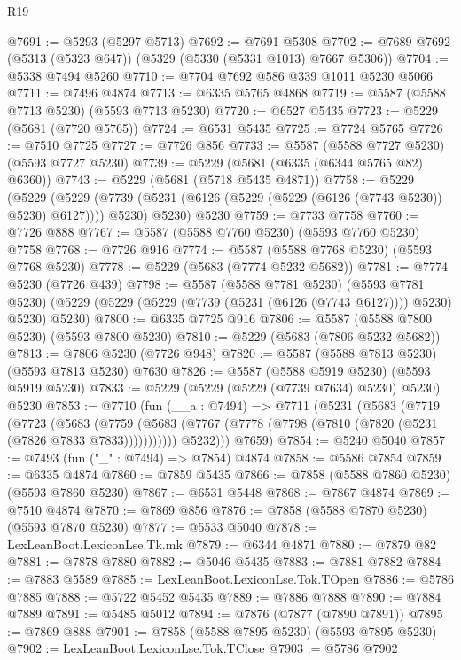 \begin{lexlean}{R19}
\begin{coremodule}
@7691 := @5293 (@5297 @5713)
@7692 := @7691 @5308
@7702 := @7689 @7692 (@5313 (@5323 @647)) (@5329 (@5330 (@5331 @1013) @7667 @5306))
@7704 := @5338 @7494 @5260
@7710 := @7704 @7692 @586 @339 @1011 @5230 @5066
@7711 := @7496 @4874
@7713 := @6335 @5765 @4868
@7719 := @5587 (@5588 @7713 @5230) (@5593 @7713 @5230)
@7720 := @6527 @5435
@7723 := @5229 (@5681 (@7720 @5765))
@7724 := @6531 @5435
@7725 := @7724 @5765
@7726 := @7510 @7725
@7727 := @7726 @856
@7733 := @5587 (@5588 @7727 @5230) (@5593 @7727 @5230)
@7739 := @5229 (@5681 (@6335 (@6344 @5765 @82) @6360))
@7743 := @5229 (@5681 (@5718 @5435 @4871))
@7758 := @5229
    (@5229
      (@5229 (@7739 (@5231 (@6126 (@5229 (@5229 (@6126 (@7743 @5230)) @5230) @6127)))) @5230)
      @5230)
    @5230
@7759 := @7733 @7758
@7760 := @7726 @888
@7767 := @5587 (@5588 @7760 @5230) (@5593 @7760 @5230) @7758
@7768 := @7726 @916
@7774 := @5587 (@5588 @7768 @5230) (@5593 @7768 @5230)
@7778 := @5229 (@5683 (@7774 @5232 @5682))
@7781 := @7774 @5230 (@7726 @439)
@7798 := @5587
    (@5588 @7781 @5230)
    (@5593 @7781 @5230)
    (@5229 (@5229 (@5229 (@7739 (@5231 (@6126 (@7743 @6127)))) @5230) @5230) @5230)
@7800 := @6335 @7725 @916
@7806 := @5587 (@5588 @7800 @5230) (@5593 @7800 @5230)
@7810 := @5229 (@5683 (@7806 @5232 @5682))
@7813 := @7806 @5230 (@7726 @948)
@7820 := @5587 (@5588 @7813 @5230) (@5593 @7813 @5230) @7630
@7826 := @5587 (@5588 @5919 @5230) (@5593 @5919 @5230)
@7833 := @5229 (@5229 (@5229 (@7739 @7634) @5230) @5230) @5230
@7853 := @7710
    (fun (__a : @7494) =>
    @7711
      (@5231
        (@5683
          (@7719
            (@7723
              (@5683
                (@7759
                  (@5683 (@7767 (@7778 (@7798 (@7810 (@7820 (@5231 (@7826 @7833 @7833)))))))))))
            @5232)))
      @7659)
@7854 := @5240 @5040
@7857 := @7493 (fun ("_" : @7494) => @7854) @4874
@7858 := @5586 @7854
@7859 := @6335 @4874
@7860 := @7859 @5435
@7866 := @7858 (@5588 @7860 @5230) (@5593 @7860 @5230)
@7867 := @6531 @5448
@7868 := @7867 @4874
@7869 := @7510 @4874
@7870 := @7869 @856
@7876 := @7858 (@5588 @7870 @5230) (@5593 @7870 @5230)
@7877 := @5533 @5040
@7878 := LexLeanBoot.LexiconLse.Tk.mk
@7879 := @6344 @4871
@7880 := @7879 @82
@7881 := @7878 @7880
@7882 := @5046 @5435
@7883 := @7881 @7882
@7884 := @7883 @5589
@7885 := LexLeanBoot.LexiconLse.Tok.TOpen
@7886 := @5786 @7885
@7888 := @5722 @5452 @5435
@7889 := @7886 @7888
@7890 := @7884 @7889
@7891 := @5485 @5012
@7894 := @7876 (@7877 (@7890 @7891))
@7895 := @7869 @888
@7901 := @7858 (@5588 @7895 @5230) (@5593 @7895 @5230)
@7902 := LexLeanBoot.LexiconLse.Tok.TClose
@7903 := @5786 @7902

\end{coremodule}
\end{lexlean}

